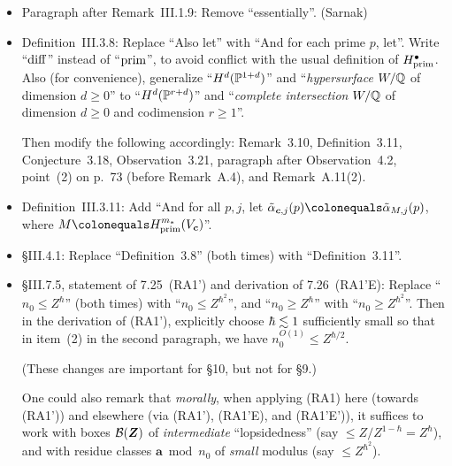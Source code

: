 \documentclass[12pt]{article}
\begin{document}
\begin{itemize}
    \item Paragraph after Remark~III.1.9:
    Remove ``essentially''.
    (Sarnak)
    
    \item Definition~III.3.8:
    Replace ``Also let'' with ``And for each prime $p$, let''.
    Write ``$\operatorname{diff}$'' instead of ``$\operatorname{prim}$'',
    to avoid conflict with the usual definition of $H^\bullet_{\operatorname{prim}}$.
    Also (for convenience), generalize ``$H^d(\mathbb{P}^{1+d})$'' and ``\emph{hypersurface} $W/\mathbb{Q}$ of dimension $d\geq 0$''
    to ``$H^d(\mathbb{P}^{r+d})$'' and ``\emph{complete intersection} $W/\mathbb{Q}$ of dimension $d\geq 0$ and codimension $r\geq 1$''.
    
    Then modify the following accordingly:
    Remark~3.10,
    Definition~3.11,
    Conjecture~3.18,
    Observation~3.21,
    paragraph after Observation~4.2,
    point~(2) on p.~73 (before Remark~A.4),
    and Remark~A.11(2).
    
    \item Definition~III.3.11:
    Add ``And for all $p,j$, let $\tilde{\alpha}_{\bm{c},j}(p)\defeq \tilde{\alpha}_{M,j}(p)$, where $M\defeq H^{m_\ast}_{\map{prim}}(V_{\bm{c}})$''.
    
    \item \S{III.4.1}:
    Replace ``Definition~3.8'' (both times) with ``Definition~3.11''.
    
    \item \S{III.7.5}, statement of 7.25~(RA1') and derivation of 7.26~(RA1'E):
    Replace ``$n_0\leq Z^\hbar$'' (both times) with ``$n_0\leq Z^{\hbar^2}$'',
    and ``$n_0\geq Z^\hbar$'' with ``$n_0\geq Z^{\hbar^2}$''.
    Then in the derivation of (RA1'),
    explicitly choose $\hbar\lesssim 1$ sufficiently small
    so that in item~(2) in the second paragraph, we have $n_0^{O(1)}\leq Z^{\hbar/2}$.
    
    (These changes are important for \S10, but not for \S9.)
    
    One could also remark that \emph{morally}, when applying (RA1) here (towards (RA1')) and elsewhere (via (RA1'), (RA1'E), and (RA1'E')),
    it suffices to work with boxes $\mathcal{B}(\bm{Z})$ of \emph{intermediate} ``lopsidedness'' (say $\leq Z/Z^{1-\hbar} = Z^\hbar$),
    and with residue classes $\bm{a}\bmod{n_0}$ of \emph{small} modulus (say $\leq Z^{\hbar^2}$).
    

\end{itemize}
\end{document}
